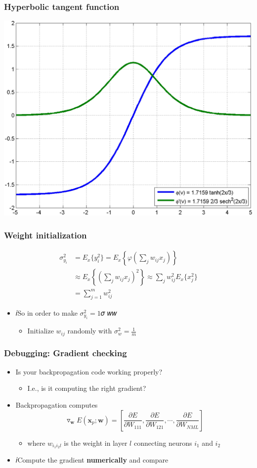\documentclass[12pt,notes,mathserif]{beamer}
\begin{document}
\begin{frame}[c]
\frametitle{Hyperbolic tangent function}
\begin{center}
\includegraphics[width=0.7\linewidth]{fig/lec69.jpg}
\end{center}
\end{frame}

\begin{frame}[c]
\frametitle{Weight initialization}
\[
\begin{array}{rl}
\sigma_{y_i}^2&=E_x\{y_i^2\}=E_x\left\{\varphi\left(\sum\limits_jw_{ij}x_j\right)\right\}\\[5mm]
&\approx E_x \left\{\left(\sum\limits_jw_{ij}x_j\right)^2\right\}\approx
\sum\limits_jw_{ij}^2E_x\{x_j^2\}\\
&=\sum\limits_{j=1}^mw_{ij}^2
\end{array}
\]
\begin{itemize}
\item 𝑖So in order to make $\sigma_{y_i}^2=1$𝜎 𝑤𝑤
		\begin{itemize}
		\item Initialize $w_{ij}$ randomly with $\sigma_w^2=\frac{1}{m}$
		\end{itemize}
\end{itemize}
\end{frame}

\begin{frame}[c]
\frametitle{Debugging: Gradient checking}
\begin{itemize}
\item Is your backpropagation code working properly?
		\begin{itemize}
		\item I.e., is it computing the right gradient?
		\end{itemize}
\item Backpropagation computes
\[
\triangledown_{\mathbf{w}}E(\mathbf{x}_p;\mathbf{w})=
\left[
\frac{\partial E}{\partial W_{111}},
\frac{\partial E}{\partial W_{121}},\cdots,
\frac{\partial E}{\partial W_{NML}}
\right]
\]
		\begin{itemize}
		\item where $w_{i_1i_2l}$ is the weight in layer $l$ connecting neurons $i_1$ and $i_2$
		\end{itemize}
\item 𝑖Compute the gradient {\bf numerically} and compare
\end{itemize}
\end{frame}
\end{document}
